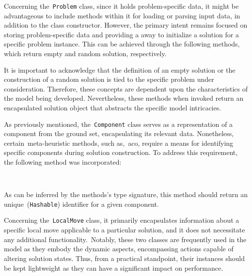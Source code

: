 Concerning the~\texttt{Problem} class, since it holds problem-specific data, it
might be advantageous to include methods within it for loading or parsing input
data, in addition to the class constructor. However, the primary intent remains
focused on storing problem-specific data and providing a away to initialize a
solution for a specific problem instance. This can be achieved through the
following methods, which return empty and random solution, respectively.

\begin{center}

\end{center}

It is important to acknowledge that the definition of an empty solution or the
construction of a random solution is tied to the specific problem under
consideration. Therefore, these concepts are dependent upon the characteristics
of the model being developed. Nevertheless, these methods when invoked return an
encapsulated solution object that abstracts the specific model intricacies.

As previously mentioned, the~\texttt{Component} class serves as a representation
of a component from the ground set, encapsulating its relevant data.
Nonetheless, certain~\acrshort{meta-heuristic} methods, such as,~\acrshort{aco},
require a means for identifying specific components during solution
construction. To address this requirement, the following method was
incorporated:

\begin{center}
  \\
\end{center}

As can be inferred by the methods's type signature, this method should return
an unique~(\texttt{Hashable}) identifier for a given component.

Concerning the~\texttt{LocalMove} class, it primarily encapsulates information
about a specific local move applicable to a particular solution, and it does not
necessitate any additional functionality.~Notably, these two classes are
frequently used in the model as they embody the dynamic aspects, encompassing
actions capable of altering solution states. Thus, from a practical standpoint,
their instances should be kept lightweight as they can have a significant impact
on performance.

